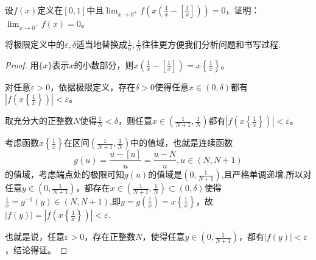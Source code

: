 \documentclass[../../main.tex]{subfiles}%
\begin{document}
\begin{example}
设\(f(x)\)定义在\([0,1]\)中且\(\lim_{x\rightarrow0^{+}}f\left(x\left(\frac{1}{x}-\left[\frac{1}{x}\right]\right)\right)=0\)，证明：\(\lim_{x\rightarrow0^{+}}f(x)=0\)。
\end{example}
\begin{note}
将极限定义中的$\varepsilon,\delta$适当地替换成$\frac{1}{n},\frac{1}{N}$往往更方便我们分析问题和书写过程.
\end{note}
\begin{proof}

用\(\{x\}\)表示\(x\)的小数部分，则\(x\left(\frac{1}{x}-\left[\frac{1}{x}\right]\right)=x\left\{\frac{1}{x}\right\}\)。

对任意\(\varepsilon>0\)，依据极限定义，存在\(\delta>0\)使得任意\(x\in(0,\delta)\)都有\(\left|f\left(x\left\{\frac{1}{x}\right\}\right)\right|<\varepsilon\)。

取充分大的正整数\(N\)使得\(\frac{1}{N}<\delta\)，则任意\(x\in\left(\frac{1}{N + 1},\frac{1}{N}\right)\)都有\(\left|f\left(x\left\{\frac{1}{x}\right\}\right)\right|<\varepsilon\)。

考虑函数\(x\left\{\frac{1}{x}\right\}\)在区间\(\left(\frac{1}{N + 1},\frac{1}{N}\right)\)中的值域，也就是连续函数
\[g(u)=\frac{u - [u]}{u}=\frac{u - N}{u},u\in(N,N + 1)\]
的值域，考虑端点处的极限可知\(g(u)\)的值域是\(\left(0,\frac{1}{N + 1}\right)\),且严格单调递增.所以对任意\(y\in\left(0,\frac{1}{N + 1}\right)\)，都存在\(x\in\left(\frac{1}{N + 1},\frac{1}{N}\right)\subset(0,\delta)\)使得$\frac{1}{x}=g^{-1}(y)\in(N,N+1)$,即\(y =g(\frac{1}{x})= x\left\{\frac{1}{x}\right\}\)，故\(|f(y)|=\left|f\left(x\left\{\frac{1}{x}\right\}\right)\right|<\varepsilon\).

也就是说，任意\(\varepsilon>0\)，存在正整数\(N\)，使得任意\(y\in\left(0,\frac{1}{N + 1}\right)\)，都有\(|f(y)|<\varepsilon\)，结论得证。

\end{proof}
\end{document}
